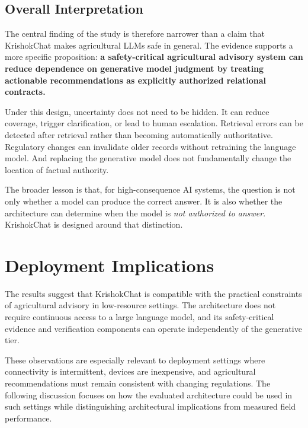 \documentclass[a4paper,fleqn]{cas-dc}
\begin{document}
\subsection{Overall Interpretation}

The central finding of the study is therefore narrower than a claim that KrishokChat makes agricultural LLMs safe in general. The evidence supports a more specific proposition: \textbf{a safety-critical agricultural advisory system can reduce dependence on generative model judgment by treating actionable recommendations as explicitly authorized relational contracts.}

Under this design, uncertainty does not need to be hidden. It can reduce coverage, trigger clarification, or lead to human escalation. Retrieval errors can be detected after retrieval rather than becoming automatically authoritative. Regulatory changes can invalidate older records without retraining the language model. And replacing the generative model does not fundamentally change the location of factual authority.

The broader lesson is that, for high-consequence AI systems, the question is not only whether a model can produce the correct answer. It is also whether the architecture can determine when the model is \emph{not authorized to answer}. KrishokChat is designed around that distinction.


\section{Deployment Implications}
\label{sec:deployment_implications}

The results suggest that KrishokChat is compatible with the practical constraints of agricultural advisory in low-resource settings. The architecture does not require continuous access to a large language model, and its safety-critical evidence and verification components can operate independently of the generative tier.

These observations are especially relevant to deployment settings where connectivity is intermittent, devices are inexpensive, and agricultural recommendations must remain consistent with changing regulations. The following discussion focuses on how the evaluated architecture could be used in such settings while distinguishing architectural implications from measured field performance.
\end{document}
